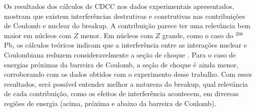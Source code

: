 \documentclass[a4paper,12pt,oneside]{book}
\begin{document}
\par Os resultados dos cálculos de CDCC nos dados experimentais apresentados, mostram que existem interferências destrutivas e construtivas nas contribuições de Coulomb e nuclear do breakup. A contribuição parece ter uma relevância bem maior em núcleos com $Z$ menor. Em núcleos com $Z$ grande, como o caso do $^{208}$Pb, os cálculos teóricos indicam que a interferência entre as interações nuclear e Coulombiana reduzem consideravelmente a seção de choque \cite{Kolata2016, MORO_BREAKUP}. Para o caso de energias próximas da barreira de Coulomb, a seção de choque é ainda menor, corroborando com os dados obtidos com o experimento desse trabalho. Com esses resultados, será possível entender melhor a natureza do breakup, qual relevância de cada contribuição, como os efeitos de interferência acontecem, em diversas regiões de energia (acima, próxima e abaixo da barreira de Coulomb).



\end{document}

